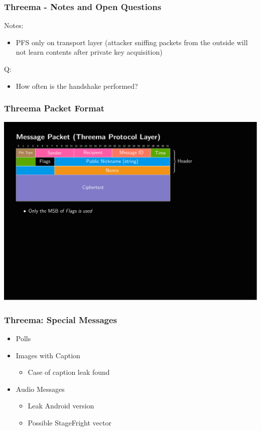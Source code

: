 \documentclass[aspectratio=169]{beamer}
\begin{document}
\begin{frame}
	\frametitle{Threema - Notes and Open Questions}
	Notes:
	\begin{itemize}
		\item PFS only on transport layer (attacker sniffing packets from the outside will not learn contents after private key acquisition)
	\end{itemize}
	Q:
	\begin{itemize}
		\item How often is the handshake performed?
	\end{itemize}
\end{frame}

\begin{frame}
	\frametitle{Threema Packet Format}

	\includegraphics[page=1,clip,trim={.99cm 8cm 3.2cm 1.8cm},width=\textwidth]{out/messages.pdf}

\end{frame}

\begin{frame}
	\frametitle{Threema: Special Messages}
	\begin{itemize}
		\item Polls
		\item Images with Caption
			\begin{itemize}
				\item Case of caption leak found
			\end{itemize}
		\item Audio Messages
			\begin{itemize}
				\item Leak Android version
				\item Possible StageFright vector
			\end{itemize}
	\end{itemize}
\end{frame}
\end{document}
